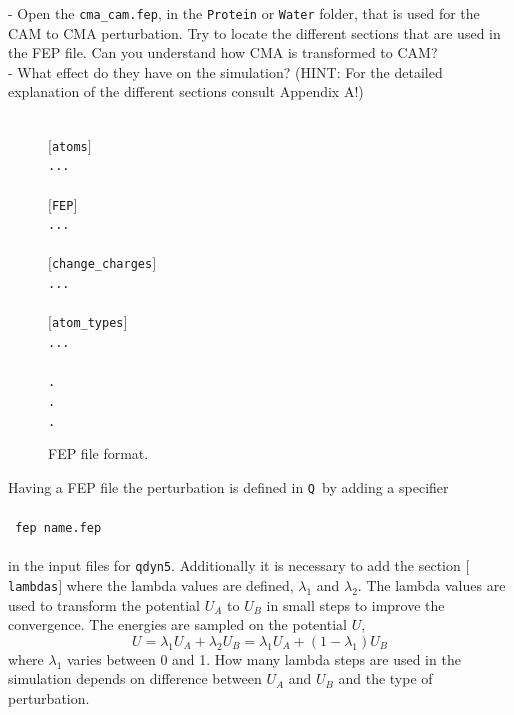\documentclass[a4paper,12pt]{article}
\newcommand{\qdyn}{\texttt{qdyn5}}
\newcommand{\q}{\texttt{Q}}
\begin{document}
- Open the \texttt{cma\_cam.fep}, in the \texttt{Protein} or
\texttt{Water} folder, that is used for the CAM to CMA
perturbation. Try to locate the different sections that are used
in the FEP file. Can you understand how CMA is transformed to CAM?\\

- What effect do they have on the simulation? (HINT: For the detailed explanation
of the different sections consult Appendix A!)\\


\begin{figure}[ht]
\texttt{
\\
$[$atoms$]$\\
...\\
\\
$[$FEP$]$\\
...\\
\\
$[$change\_charges$]$\\
...\\
\\
$[$atom\_types$]$\\
...\\
\\
.\\
.\\
.\\
}
\caption{\label{fig:fepfile}FEP file format.}
\end{figure}

Having a FEP file the perturbation is defined in \q\ by adding a
specifier
\\
\\
\texttt{ fep \hspace{2cm}    name.fep}
\\
\\
in the input files for \qdyn. Additionally it is necessary to add
the section \texttt{$[$lambdas$]$} where the lambda values are
defined, $\lambda_1$ and $\lambda_2$. The lambda values are used
to transform the potential $U_A$ to $U_B$ in small steps to
improve the convergence. The energies are sampled on the potential
$U$,
\begin{equation}
\label{eq:lambda}
U=\lambda_1 U_A + \lambda_2 U_B = \lambda_1 U_A + (1-\lambda_1) U_B
\end{equation}
where $\lambda_1$ varies between 0 and 1. How many lambda steps
are used in the simulation depends on difference between
$U_A$ and $U_B$ and the type of perturbation.\\
\end{document}
